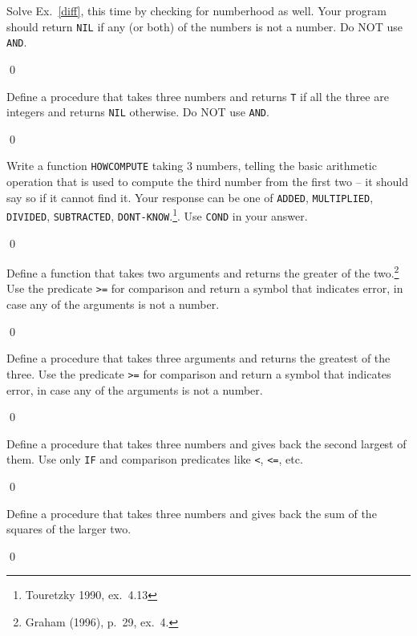 \documentclass[a4paper,11pt]{article}
\begin{document}
\begin{uexercise}
Solve Ex.~\ref{diff}, this time by checking for numberhood as well. Your program should return \Verb+NIL+ if any (or both) of the numbers is not a number. Do NOT use \Verb+AND+. 

\qed
\end{uexercise}

\begin{uexercise}
Define a procedure that takes three numbers and returns \Verb+T+ if all the three are integers and returns \Verb+NIL+ otherwise. Do NOT use \Verb+AND+. 

\qed
\end{uexercise}


\begin{uexercise}
Write a function \Verb+HOWCOMPUTE+ taking 3 numbers, telling the basic arithmetic operation that is used to compute the third number from the first two -- it should say so if it cannot find it. Your response can be one of \Verb+ADDED+, \Verb+MULTIPLIED+, \Verb+DIVIDED+, \Verb+SUBTRACTED+, \Verb+DONT-KNOW+.\footnote{Touretzky 1990, ex.\ 4.13}. Use \Verb+COND+ in your answer.

\qed
\end{uexercise}

\begin{uexercise}
Define a function that takes two arguments and returns the greater of the two.\footnote{Graham (1996), p.\ 29, ex.\ 4.} Use the predicate \Verb+>=+ for comparison and return a symbol that indicates error, in case any of the arguments is not a number.

\qed
\end{uexercise}

\begin{uexercise}
Define a procedure that takes three arguments and returns the greatest of the three.  Use the predicate \Verb+>=+ for comparison and return a symbol that indicates error, in case any of the arguments is not a number.

\qed
\end{uexercise}

\begin{uexercise}
\label{seclarge}
Define a procedure that takes three numbers and gives back the second largest of them. Use only \Verb+IF+ and comparison predicates like \Verb+<+, \Verb+<=+, etc.

\qed
\end{uexercise}

\begin{uexercise}

Define a procedure that takes three numbers and gives back the sum of the squares of the larger two. 

\qed
\end{uexercise}
\end{document}
